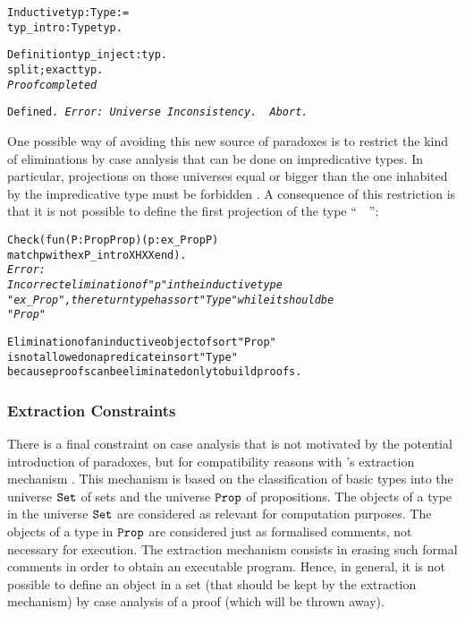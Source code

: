 \documentclass[11pt]{article}
\newcommand{\refmancite}[1]{{}}
\begin{document}
\begin{alltt}
Inductive  typ : Type :=
  typ_intro : Type {\arrow} typ.

Definition typ_inject: typ.
 split; exact typ.
\it Proof completed

\tt{}Defined.
\it Error: Universe Inconsistency.
\tt
Abort.
\end{alltt}

One possible way of avoiding this new source of paradoxes is to
restrict the kind of eliminations by case analysis that can be done on
impredicative types. In particular, projections on those universes
equal or bigger than the one inhabited by the impredicative type must
be forbidden \cite{Coq86}. A consequence of this restriction is that it
is not possible to define the first projection of the type
``~~'':
\begin{alltt}
Check (fun (P:Prop{\arrow}Prop)(p: ex_Prop P) {\funarrow}
      match p with exP_intro X HX {\funarrow} X end).
\it
Error:
Incorrect elimination of "p" in the inductive type
"ex_Prop", the return type has sort "Type" while it should be
"Prop"

Elimination of an inductive object of sort "Prop"
is not allowed on a predicate in sort "Type"
because proofs can be eliminated only to build proofs.
\end{alltt}

%
%

\subsubsection{Extraction Constraints}

There is a final constraint on case analysis that is not motivated by
the potential introduction of paradoxes, but for compatibility reasons
with {\coq}'s extraction mechanism \refmancite{Appendix
\ref{CamlHaskellExtraction}}. This mechanism is based on the
classification of basic types into the universe $\texttt{Set}$ of sets and the
universe $\texttt{Prop}$ of propositions.  The objects of a type in the
universe $\texttt{Set}$ are considered as relevant for computation
purposes. The objects of a type in $\texttt{Prop}$ are considered just as
formalised comments, not necessary for execution. The extraction
mechanism consists in erasing such formal comments in order to obtain
an executable program. Hence, in general, it is not possible to define
an object in a set (that should be kept by the extraction mechanism)
by case analysis of a proof (which will be thrown away).
\end{document}
